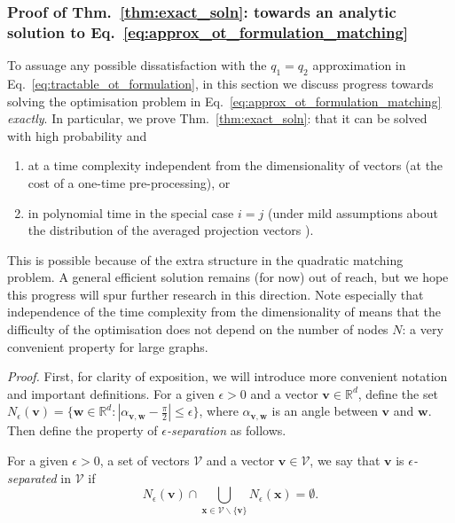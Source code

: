 \subsubsection{Proof of Thm.~\ref{thm:exact_soln}: towards an analytic solution to Eq.~\ref{eq:approx_ot_formulation_matching} }
\label{sec:quad_grfs}
To assuage any possible dissatisfaction with the $q_1=q_2$ approximation in Eq.~\ref{eq:tractable_ot_formulation}, in this section we discuss progress towards solving the optimisation problem in Eq.~\ref{eq:approx_ot_formulation_matching} \emph{exactly}.  %
In particular, we prove Thm.~\ref{thm:exact_soln}:
that it can be solved with high probability and
\begin{enumerate}
\item at a time complexity independent from the dimensionality of vectors   (at the cost of a one-time pre-processing), or
\item in polynomial time in the special case $i=j$ (under mild assumptions about the distribution of the averaged projection vectors ).
\end{enumerate}

This is possible because of the extra structure in the quadratic matching problem.
A general efficient solution remains (for now) out of reach, but we hope this progress will spur further research in this direction.
Note especially that independence of the time complexity from the dimensionality of  means that the difficulty of the optimisation does not depend on the number of nodes $N$: a very 
convenient property for large graphs.

\emph{Proof.} 
First, for clarity of exposition, we will introduce more convenient notation and important definitions. 
For a given $\epsilon>0$ and a vector $\mathbf{v} \in \mathbb{R}^{d}$, define the set $N_{\epsilon}(\mathbf{v})=\{\mathbf{w} \in \mathbb{R}^{d}:|\alpha_{\mathbf{v},\mathbf{w}}-\frac{\pi}{2}| \leq \epsilon\}$, where $\alpha_{\mathbf{v},\mathbf{w}}$ is an angle between $\mathbf{v}$ and $\mathbf{w}$.
Then define the property of \emph{$\epsilon$-separation} as follows.

\begin{definition} \label{def:eps_sep}
For a given $\epsilon>0$, a set of vectors $\mathcal{V}$ and a vector $\mathbf{v} \in \mathcal{V}$, we say that $\mathbf{v}$ is \emph{$\epsilon$-separated} in $\mathcal{V}$ if
\begin{equation}
N_{\epsilon}(\mathbf{v}) \cap \bigcup_{\mathbf{x} \in \mathcal{V} \backslash \{\mathbf{v}\}} N_{\epsilon}(\mathbf{x}) = \emptyset.
\end{equation}
\end{definition}

